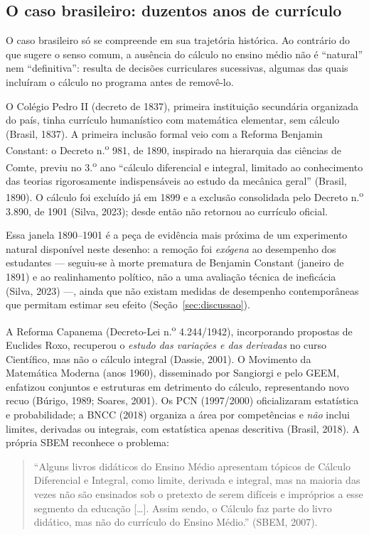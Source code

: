 \documentclass[12pt,a4paper,oneside]{article}
\begin{document}
\subsection{O caso brasileiro: duzentos anos de currículo}

O caso brasileiro só se compreende em sua trajetória histórica. Ao
contrário do que sugere o senso comum, a ausência do cálculo no ensino
médio não é ``natural'' nem ``definitiva'': resulta de decisões
curriculares sucessivas, algumas das quais incluíram o cálculo no
programa antes de removê-lo.

O Colégio Pedro II (decreto de 1837), primeira instituição secundária
organizada do país, tinha currículo humanístico com matemática elementar,
sem cálculo (Brasil, 1837). A primeira inclusão formal veio com a Reforma
Benjamin Constant: o Decreto n.\textsuperscript{o} 981, de 1890, inspirado
na hierarquia das ciências de Comte, previu no 3.\textsuperscript{o} ano
``cálculo diferencial e integral, limitado ao conhecimento das teorias
rigorosamente indispensáveis ao estudo da mecânica geral'' (Brasil, 1890).
O cálculo foi excluído já em 1899 e a exclusão consolidada pelo Decreto
n.\textsuperscript{o} 3.890, de 1901 (Silva, 2023); desde então não
retornou ao currículo oficial.

Essa janela 1890--1901 é a peça de evidência mais próxima de um
experimento natural disponível neste desenho: a remoção foi \emph{exógena}
ao desempenho dos estudantes --- seguiu-se à morte prematura de Benjamin
Constant (janeiro de 1891) e ao realinhamento político, não a uma
avaliação técnica de ineficácia (Silva, 2023) ---, ainda que não existam
medidas de desempenho contemporâneas que permitam estimar seu efeito
(Seção~\ref{sec:discussao}).

A Reforma Capanema (Decreto-Lei n.\textsuperscript{o} 4.244/1942),
incorporando propostas de Euclides Roxo, recuperou o \emph{estudo das
variações e das derivadas} no curso Científico, mas não o cálculo integral
(Dassie, 2001). O Movimento da Matemática Moderna (anos 1960), disseminado
por Sangiorgi e pelo GEEM, enfatizou conjuntos e estruturas em detrimento
do cálculo, representando novo recuo (Búrigo, 1989; Soares, 2001). Os PCN
(1997/2000) oficializaram estatística e probabilidade; a BNCC (2018)
organiza a área por competências e \emph{não} inclui limites, derivadas ou
integrais, com estatística apenas descritiva (Brasil, 2018). A própria
SBEM reconhece o problema:

\begin{quote}
\small
``Alguns livros didáticos do Ensino Médio apresentam tópicos de Cálculo
Diferencial e Integral, como limite, derivada e integral, mas na maioria
das vezes não são ensinados sob o pretexto de serem difíceis e impróprios
a esse segmento da educação [\ldots]. Assim sendo, o Cálculo faz parte do
livro didático, mas não do currículo do Ensino Médio.'' (SBEM, 2007).
\end{quote}
\end{document}
